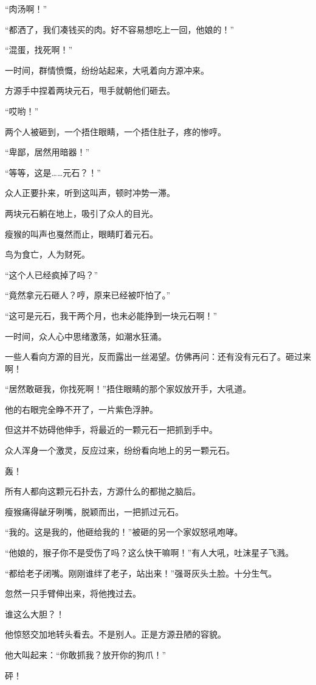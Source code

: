 \begin{this_body}
“肉汤啊！”

“都洒了，我们凑钱买的肉。好不容易想吃上一回，他娘的！”

“混蛋，找死啊！”

一时间，群情愤慨，纷纷站起来，大吼着向方源冲来。

方源手中捏着两块元石，甩手就朝他们砸去。

“哎哟！”

两个人被砸到，一个捂住眼睛，一个捂住肚子，疼的惨哼。

“卑鄙，居然用暗器！”

“等等，这是……元石？！”

众人正要扑来，听到这叫声，顿时冲势一滞。

两块元石躺在地上，吸引了众人的目光。

瘦猴的叫声也戛然而止，眼睛盯着元石。

鸟为食亡，人为财死。

“这个人已经疯掉了吗？”

“竟然拿元石砸人？哼，原来已经被吓怕了。”

“这可是元石，我干两个月，也未必能挣到一块元石啊！”

一时间，众人心中思绪激荡，如潮水狂涌。

一些人看向方源的目光，反而露出一丝渴望。仿佛再问：还有没有元石了。砸过来啊！

“居然敢砸我，你找死啊！”捂住眼睛的那个家奴放开手，大吼道。

他的右眼完全睁不开了，一片紫色浮肿。

但这并不妨碍他伸手，将最近的一颗元石一把抓到手中。

众人浑身一个激灵，反应过来，纷纷看向地上的另一颗元石。

轰！

所有人都向这颗元石扑去，方源什么的都抛之脑后。

瘦猴痛得龇牙咧嘴，脱颖而出，一把抓过元石。

“我的。这是我的，他砸给我的！”被砸的另一个家奴怒吼咆哮。

“他娘的，猴子你不是受伤了吗？这么快干嘛啊！”有人大吼，吐沫星子飞溅。

“都给老子闭嘴。刚刚谁绊了老子，站出来！”强哥灰头土脸。十分生气。

忽然一只手臂伸出来，将他拽过去。

谁这么大胆？！

他惊怒交加地转头看去。不是别人。正是方源丑陋的容貌。

他大叫起来：“你敢抓我？放开你的狗爪！”

砰！


\end{this_body}
